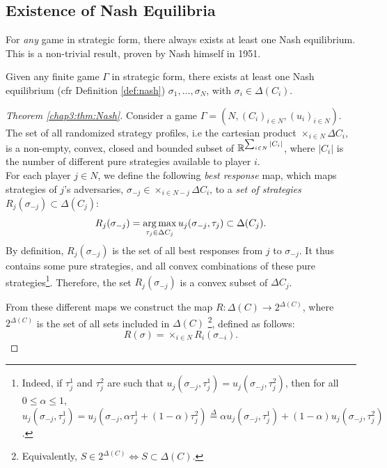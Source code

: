 \subsection{Existence of Nash Equilibria}


For \emph{any} game in strategic form, there always exists at least one Nash equilibrium.
This is a non-trivial result, proven by Nash himself in 1951.

\begin{theorem}
Given any finite game $\Gamma$ in strategic form, there exists at least one Nash equilibrium (cfr Definition \ref{def:nash}) $\sigma_1, \ldots, \sigma_N$, with $\sigma_i \in \Delta(C_i)$.
\label{chap3:thm:Nash}
\end{theorem}



\begin{proof}[Theorem \ref{chap3:thm:Nash}]
Consider a game $\Gamma = (N, (C_i)_{i \in N}, (u_i)_{i \in N}). $\\
The set of all randomized strategy profiles, i.e the cartesian product $\times_{i \in N} \Delta C_i$, is a non-empty, convex, closed and bounded subset of $\mathbb{R}^{\sum_{i \in N} |C_i|}$, where $|C_i|$ is the number of different pure strategies available to player $i$. \\
For each player $j \in N$, we define the following \emph{best response} map, which maps strategies of $j$'s adversaries, $\sigma_{-j} \in \times_{i \in N - j} \Delta C_i$, to a \emph{set of strategies} $R_j(\sigma_{-j}) \subset \Delta (C_j)$:
$$R_j(\sigma_{-j}) = \operatorname*{arg\,max}_{\tau_j \in \Delta C_j} u_j(\sigma_{-j}, \tau_j) \subset{\Delta(C_{j})}. $$
By definition, $R_j(\sigma_{-j})$ is the set of all best responses from $j$ to $\sigma_{-j}$.
It thus contains some pure strategies, and all convex combinations of these pure strategies\footnote{ Indeed, if $\tau_j^1$ and $\tau_{j}^2$ are such that $u_j(\sigma_{-j}, \tau_j^1) = u_{j}(\sigma_{-j}, \tau_j^2)$, then for all $0 \leq \alpha \leq 1$, $u_j(\sigma_{-j}, \tau_j^1) = u_{j}(\sigma_{-j}, \alpha \tau_j^1 + (1-\alpha) \tau_j^2) \overset{\Delta}{=} \alpha u_j(\sigma_{-j}, \tau_j^1)+ (1-\alpha) u_{j}(\sigma_{-j}, \tau_j^2)$.}.
Therefore, the set $R_j(\sigma_{-j})$ is a convex subset of $\Delta C_j$.

From these different maps we construct the map $R : \Delta(C) \rightarrow 2^{\Delta(C)}$, where $2^{\Delta(C)}$ is the set of all sets included in ${\Delta(C)}$ \footnote{Equivalently,
$S \in 2^{\Delta(C)} \Leftrightarrow S \subset \Delta(C).$}, defined as follows:
$$R(\sigma) = \times_{i \in N}R_{i}(\sigma_{-i}). $$


\end{proof}
